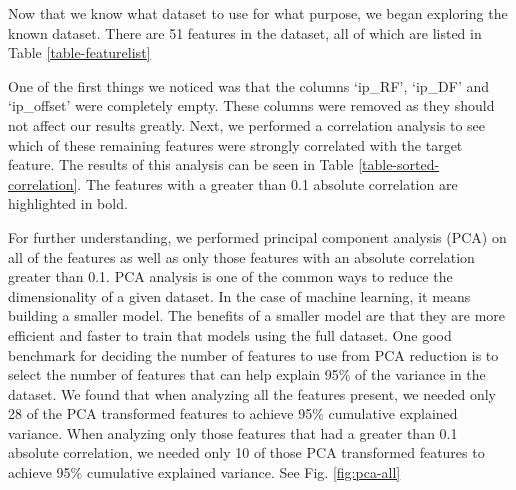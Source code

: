 Now that we know what dataset to use for what purpose, we began exploring the known dataset. There are 51 features in the dataset, all of which are listed in Table \ref{table-featurelist}




One of the first things we noticed was that the columns `ip\_RF', `ip\_DF' and `ip\_offset' were completely empty. These columns were removed as they should not affect our results greatly. Next, we performed a correlation analysis to see which of these remaining features were strongly correlated with the target feature. The results of this analysis can be seen in Table \ref{table-sorted-correlation}. The features with a greater than 0.1 absolute correlation are highlighted in bold.



For further understanding, we performed principal component analysis (PCA) on all of the features as well as only those features with an absolute correlation greater than 0.1. PCA analysis is one of the common ways to reduce the dimensionality of a given dataset. In the case of machine learning, it means building a smaller model. The benefits of a smaller model are that they are more efficient and faster to train that models using the full dataset. One good benchmark for deciding the number of features to use from PCA reduction is to select the number of features that can help explain 95\% of the variance in the dataset. We found that when analyzing all the features present, we needed only 28 of the PCA transformed features to achieve 95\% cumulative explained variance. When analyzing only those features that had a greater than 0.1 absolute correlation, we needed only 10 of those PCA transformed features to achieve 95\% cumulative explained variance. See Fig. \ref{fig:pca-all} 

